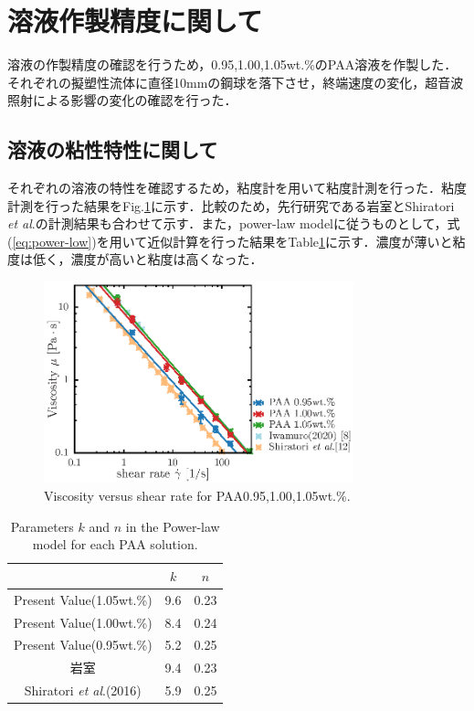 \section{溶液作製精度に関して}

溶液の作製精度の確認を行うため，0.95,1.00,1.05wt.\%のPAA溶液を作製した．それぞれの擬塑性流体に直径10mmの鋼球を落下させ，終端速度の変化，超音波照射による影響の変化の確認を行った．

\subsection{溶液の粘性特性に関して}
それぞれの溶液の特性を確認するため，粘度計を用いて粘度計測を行った．粘度計測を行った結果をFig.\ref{fig:95-105}に示す．比較のため，先行研究である岩室\cite{ref:8}とShiratori \textit{et al}.\cite{ref:9}の計測結果も合わせて示す．また，power-law modelに従うものとして，式(\ref{eq:power-low})を用いて近似計算を行った結果をTable\ref{table:005_knParameter}に示す．濃度が薄いと粘度は低く，濃度が高いと粘度は高くなった．

\begin{figure}[ht]
    \includegraphics[width=0.8\textwidth]{X-Appendix/concentration/viscosity/viscosity.eps}
    \caption{Viscosity versus shear rate for PAA0.95,1.00,1.05wt.\%.}
    \label{fig:95-105}
\end{figure}

\begin{table}[h]
    \centering
    \caption{Parameters $k$ and $n$ in the Power-law model for each PAA solution.}
    \label{table:005_knParameter}
    \begin{tabular}{c|c|c} \hline
                                                     & $k$ & $n$  \\ \hline \hline
        Present Value(1.05wt.\%)                     & 9.6 & 0.23 \\
        Present Value(1.00wt.\%)                     & 8.4 & 0.24 \\
        Present Value(0.95wt.\%)                     & 5.2 & 0.25 \\
        岩室\cite{ref:8}                             & 9.4 & 0.23 \\
        Shiratori \textit{et al}.(2016)\cite{ref:10} & 5.9 & 0.25 \\ \hline
    \end{tabular}
\end{table}

